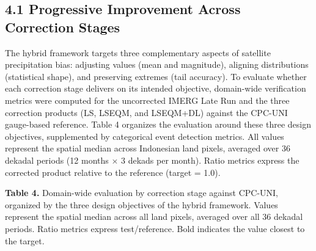 \documentclass[
]{article}
\begin{document}
\subsection{4.1 Progressive Improvement Across Correction
Stages}

The hybrid framework targets three complementary aspects of satellite
precipitation bias: adjusting values (mean and magnitude), aligning
distributions (statistical shape), and preserving extremes (tail
accuracy). To evaluate whether each correction stage delivers on its
intended objective, domain-wide verification metrics were computed for
the uncorrected IMERG Late Run and the three correction products (LS,
LSEQM, and LSEQM+DL) against the CPC-UNI gauge-based reference. Table 4
organizes the evaluation around these three design objectives,
supplemented by categorical event detection metrics. All values
represent the spatial median across Indonesian land pixels, averaged
over 36 dekadal periods (12 months \(\times\) 3 dekads per month). Ratio
metrics express the corrected product relative to the reference (target
= 1.0).

\textbf{Table 4.} Domain-wide evaluation by correction stage against
CPC-UNI, organized by the three design objectives of the hybrid
framework. Values represent the spatial median across all land pixels,
averaged over all 36 dekadal periods. Ratio metrics express
test/reference. Bold indicates the value closest to the target.
\end{document}

